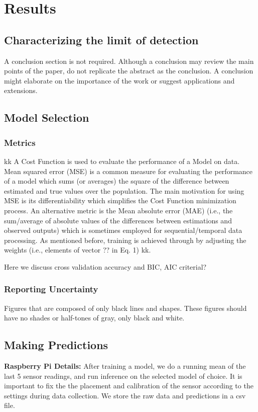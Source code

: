 \documentclass[journal,twoside,web]{ieeecolor}
\begin{document}
\section{Results }


\subsection{Characterizing the limit of detection}

A conclusion section is not required. Although a conclusion may review the 
main points of the paper, do not replicate the abstract as the conclusion. A 
conclusion might elaborate on the importance of the work or suggest 
applications and extensions.

\subsection{Model Selection}

\subsubsection{Metrics}
{
kk A Cost Function is used to evaluate the performance of a Model on data. Mean squared error (MSE) is a common measure for evaluating the performance of a model which sums (or averages) the square of the difference between estimated and true values over the population. The main motivation for using MSE is its differentiability which simplifies the Cost Function minimization process. An alternative metric is the Mean absolute error (MAE) (i.e., the sum/average of absolute values of the differences between estimations and observed outputs) which is sometimes employed for sequential/temporal data processing. As mentioned before, training is achieved through by adjusting the weights (i.e., elements of vector ?? in Eq. 1) kk. }

Here we discuss cross validation accuracy and BIC, AIC criterial? 

\subsubsection{Reporting Uncertainty}
{Figures that are composed of only black lines and shapes. These figures 
should have no shades or half-tones of gray, only black and white.}


\subsection{Making Predictions}
\textbf{Raspberry Pi Details: }
After training a model, we do a running mean of the last 5 sensor readings, and run inference on the selected model of choice. It is important to fix the 
the placement and calibration of the sensor according to the settings during data collection. We store the raw data and predictions in a csv file.
\end{document}
